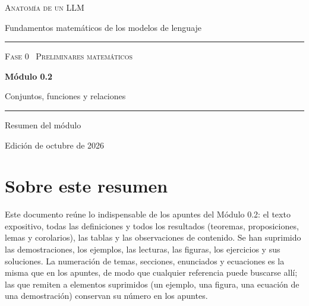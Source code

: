 \documentclass[11pt,a4paper,twoside,openany]{book}
\begin{document}
\frontmatter
\begin{titlepage}
\centering
\vspace*{2.5cm}
{\large\scshape Anatomía de un LLM}\par
\vspace{0.4cm}
{\normalsize Fundamentos matemáticos de los modelos de lenguaje}\par
\vspace{2.2cm}
\rule{\textwidth}{0.8pt}\par\vspace{0.5cm}
{\small\scshape Fase 0 \textperiodcentered\ Preliminares matemáticos}\par\vspace{0.3cm}
{\Huge\bfseries Módulo 0.2\par}\vspace{0.3cm}
{\LARGE Conjuntos, funciones y relaciones\par}
\vspace{0.5cm}\rule{\textwidth}{0.4pt}\par
\vspace{1.6cm}
{\large Resumen del módulo}\par
\vfill
{\small Edición de octubre de 2026}\par
\end{titlepage}

\chapter*{Sobre este resumen}

Este documento reúne lo indispensable de los apuntes del Módulo 0.2: el texto expositivo, todas las definiciones y todos los resultados (teoremas, proposiciones, lemas y corolarios), las tablas y las observaciones de contenido. Se han suprimido las demostraciones, los ejemplos, las lecturas, las figuras, los ejercicios y sus soluciones. La numeración de temas, secciones, enunciados y ecuaciones es la misma que en los apuntes, de modo que cualquier referencia puede buscarse allí; las que remiten a elementos suprimidos (un ejemplo, una figura, una ecuación de una demostración) conservan su número en los apuntes.
\end{document}

